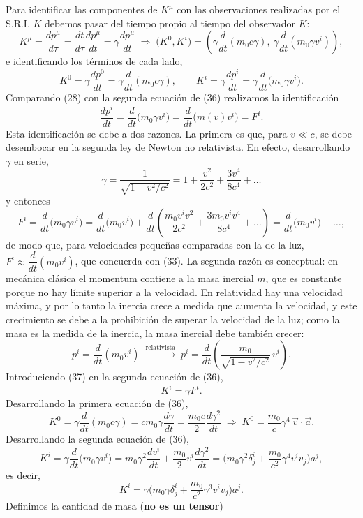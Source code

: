 Para identificar las componentes de $K^\mu$ con las observaciones
realizadas por el S.R.I. $K$ debemos pasar del tiempo propio al tiempo
del observador $K$:
\[
K^\mu = \frac{dp^\mu}{d\tau} = \frac{dt}{d\tau}\frac{dp^\mu}{dt} =
\gamma\frac{dp^\mu}{dt} \;\Rightarrow\; \big(K^0,K^i\big) = \left(\gamma
\frac{d}{dt}(m_0c\gamma),\ \gamma\frac{d}{dt}(m_0\gamma v^i)\right),
\tag{35}
\]
e identificando los términos de cada lado,
\[
K^0 = \gamma\frac{dp^0}{dt} = \gamma\frac{d}{dt}(m_0c\gamma), \qquad
K^i = \gamma\frac{dp^i}{dt} = \gamma\frac{d}{dt}\big(m_0\gamma v^i\big).
\tag{36}
\]
Comparando (28) con la segunda ecuación de (36) realizamos la
identificación
\[
\frac{dp^i}{dt} = \frac{d}{dt}\big(m_0\gamma v^i\big) = \frac{d}{dt}
\big(m(v)v^i\big) = F^i . \tag{37}
\]
Esta identificación se debe a dos razones. La primera es que, para
$v\ll c$, se debe desembocar en la segunda ley de Newton no
relativista. En efecto, desarrollando $\gamma$ en serie,
\[
\gamma = \frac{1}{\sqrt{1-v^2/c^2}} = 1+\frac{v^2}{2c^2}+\frac{3v^4}
{8c^4}+\dots
\]
y entonces
\[
F^i = \frac{d}{dt}\big(m_0\gamma v^i\big) = \frac{d}{dt}\big(m_0v^i\big)
+ \frac{d}{dt}\left(\frac{m_0v^iv^2}{2c^2}+\frac{3m_0v^iv^4}{8c^4}+\dots
\right) = \frac{d}{dt}\big(m_0v^i\big)+\dots,
\]
de modo que, para velocidades pequeñas comparadas con la de la luz,
$F^i\approx\dfrac{d}{dt}(m_0v^i)$, que concuerda con (33). La segunda
razón es conceptual: en mecánica clásica el momentum contiene a la masa
inercial $m$, que es constante porque no hay límite superior a la
velocidad. En relatividad hay una velocidad máxima, y por lo tanto la
inercia crece a medida que aumenta la velocidad, y este crecimiento se
debe a la prohibición de superar la velocidad de la luz; como la masa es
la medida de la inercia, la masa inercial debe también crecer:
\[
p^i = \frac{d}{dt}(m_0v^i) \;\xrightarrow{\text{relativista}}\; p^i =
\frac{d}{dt}\left(\frac{m_0}{\sqrt{1-v^2/c^2}}\,v^i\right).
\]
Introduciendo (37) en la segunda ecuación de (36),
\[
K^i = \gamma F^i . \tag{38}
\]
Desarrollando la primera ecuación de (36),
\[
K^0 = \gamma\frac{d}{dt}(m_0c\gamma) = cm_0\gamma\frac{d\gamma}{dt} =
\frac{m_0c}{2}\frac{d\gamma^2}{dt} \;\Rightarrow\; K^0 = \frac{m_0}{c}
\gamma^4\,\vec v\cdot\vec a . \tag{39}
\]
Desarrollando la segunda ecuación de (36),
\[
K^i = \gamma\frac{d}{dt}\big(m_0\gamma v^i\big) = m_0\gamma^2\frac{dv^i}
{dt}+\frac{m_0}{2}v^i\frac{d\gamma^2}{dt} = \Big(m_0\gamma^2\delta^i_j+
\frac{m_0}{c^2}\gamma^4v^iv_j\Big)a^j,
\]
es decir,
\[
K^i = \gamma\Big(m_0\gamma\delta^i_j+\frac{m_0}{c^2}\gamma^3v^iv_j\Big)
a^j . \tag{40}
\]
Definimos la cantidad de masa (\textbf{no es un tensor})
